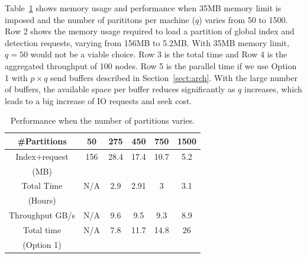  
Table~\ref{tab:overall} shows memory usage and performance when 35MB memory limit is imposed and
the number of parititons per machine ($q$) varies from 50 to 1500.
Row 2 shows the memory usage required to load a partition of global index and detection requests,
varying from 156MB to 5.2MB. With  35MB memory limit,  $q=50$ would not be a viable choice.
Row 3 is the total time and Row 4 is  the aggregated throughput of  100 nodes.
Row 5 is  the parallel time if  we use Option 1 with $p\times q$ send buffers 
described in Section~\ref{sect:arch}. 
With the large number of buffers, the available space per buffer reduces significantly as $q$ increases, which leads to
a big increase of IO requests and seek cost.  

\begin{table}[hbt]
\caption{ Performance when the number of partitions varies.}
\begin{center}
\begin{tabular} {|c|c|c|c|c|c|}
\hline \#Partitions  & 50 & 275  &450 &  750 &  1500 \\
\hline Index+request & 156&  28.4 & 17.4 & 10.7 & 5.2 \\
  (MB)           &  &   &  & &  \\

\hline Total Time  & N/A&  2.9 & 2.91 & 3 & 3.1 \\
  (Hours)           &  &   &  & &  \\
\hline Throughput GB/s& N/A&  9.6& 9.5 & 9.3 & 8.9 \\
\hline Total time & N/A&  7.8& 11.7 & 14.8 & 26 \\
  (Option 1)           &  &   &  & &  \\
\hline
\end{tabular}
\end{center}
\label{tab:overall}
\end{table}

%

